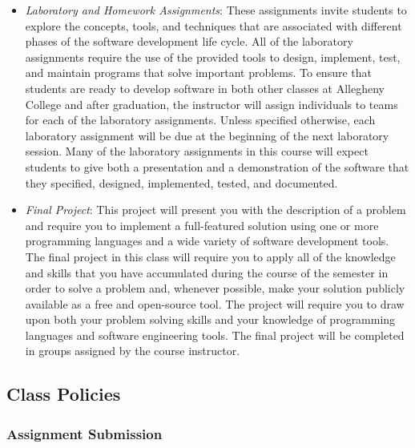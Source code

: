 \begin{itemize}
	\item {\em Laboratory and Homework Assignments}: These assignments invite students to explore the concepts, tools,
		and techniques that are associated with different phases of the software development life cycle.  All of the
		laboratory assignments require the use of the provided tools to design, implement, test, and maintain programs
		that solve important problems.  To ensure that students are ready to develop software in both other classes at
		Allegheny College and after graduation, the instructor will assign individuals to teams for each of the
		laboratory assignments.  Unless specified otherwise, each laboratory assignment will be due at the beginning of
		the next laboratory session.  Many of the laboratory assignments in this course will expect students to
		give both a presentation and a demonstration of the software that they specified, designed, implemented, tested,
		and documented.  
	

	\item {\em Final Project}: This project will present you with the description of a problem and require you to
		implement a full-featured solution using one or more programming languages and a wide variety of software
		development tools.  The final project in this class will require you to apply all of the knowledge and skills
		that you have accumulated during the course of the semester in order to solve a problem and, whenever possible,
		make your solution publicly available as a free and open-source tool.  The project will require you to draw upon
		both your problem solving skills and your knowledge of programming languages and software engineering tools. The
		final project will be completed in groups assigned by the course instructor.
		
\end{itemize}

\subsection*{Class Policies}

\subsubsection*{Assignment Submission}

